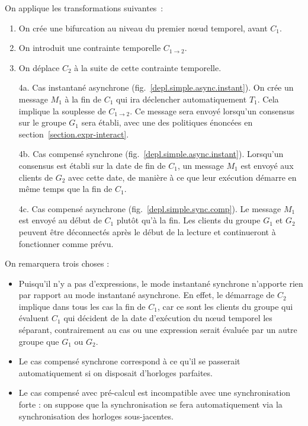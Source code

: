 \documentclass{article}
\newcommand\timenode{nœud temporel\xspace}
\begin{document}
On applique les transformations suivantes~: 
\begin{enumerate}
    \item On crée une bifurcation au niveau du premier \timenode, avant $C_1$.
    \item On introduit une contrainte temporelle $C_{1\rightarrow2}$.
    \item On déplace $C_2$ à la suite de cette contrainte temporelle.
    \item[4a.] Cas instantané asynchrone (fig.~\ref{depl.simple.async.instant}).
    On crée un message $M_1$ à la fin de $C_1$ qui ira déclencher automatiquement $T_1$. 
    Cela implique la souplesse de $C_{1\rightarrow2}$.
    Ce message sera envoyé lorsqu'un consensus sur le groupe $G_1$ sera établi, avec une des politiques énoncées en section~\ref{section.expr-interact}.
    \item[4b.] Cas compensé synchrone (fig.~\ref{depl.simple.async.instant}).
    Lorsqu'un consensus est établi sur la date de fin de $C_1$, un message $M_1$ est envoyé aux clients de $G_2$ avec cette date, de manière à ce que leur exécution démarre en même temps que la fin de $C_1$.
    \item[4c.] Cas compensé asynchrone (fig.~\ref{depl.simple.sync.comp}). 
    Le message $M_1$ est envoyé au début de $C_1$ plutôt qu'à la fin.
    Les clients du groupe $G_1$ et $G_2$ peuvent être déconnectés après le début de la lecture et continueront à fonctionner comme prévu.
\end{enumerate}

On remarquera trois choses : 
\begin{itemize}
    \item Puisqu'il n'y a pas d'expressions, le mode instantané synchrone n'apporte rien par rapport au mode instantané asynchrone.
    En effet, le démarrage de $C_2$ implique dans tous les cas la fin de $C_1$, car ce sont les clients du groupe qui évaluent $C_1$ qui décident de la date d'exécution du nœud temporel les séparant, contrairement au cas ou une expression serait évaluée par un autre groupe que $G_1$ ou $G_2$.
    \item Le cas compensé synchrone correspond à ce qu'il se passerait automatiquement si on disposait d'horloges parfaites.
    \item Le cas compensé avec pré-calcul est incompatible avec une synchronisation forte : on suppose que la synchronisation se fera automatiquement via la synchronisation des horloges sous-jacentes.
\end{itemize}
\end{document}

